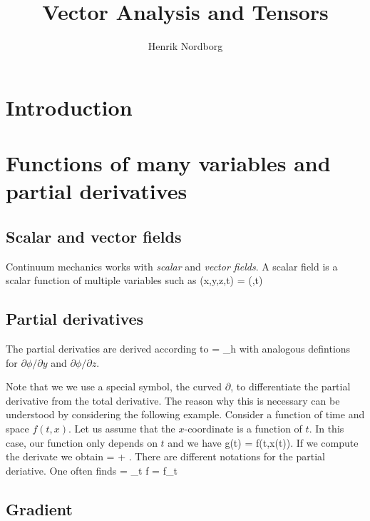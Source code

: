 \documentclass[a4paper,11pt]{article}
\begin{document}

\title{Vector Analysis and Tensors}
\author{Henrik Nordborg}
\maketitle

\section{Introduction}

\section{Functions of many variables and partial derivatives}


\subsection{Scalar and vector fields}

Continuum mechanics works with \emph{scalar} and \emph{vector fields}. A scalar field is a scalar function of multiple variables such as 
\be
\phi(x,y,z,t) = \phi(\xvec,t)
\ee

\subsection{Partial derivatives}

The partial derivaties are derived according to
\be
{} = \lim_{h} 
\ee
with analogous defintions for ${\partial \phi}/{\partial y}$ and ${\partial \phi}/{\partial z}$.

Note that we we use a special symbol, the curved $\partial$, to differentiate the partial derivative from the total derivative. The reason why this is necessary can be understood by considering the following example. Consider a function of time and space $f(t,x)$. Let us assume that the  $x$-coordinate is a function of $t$. In this case, our function only depends on $t$ and we have
\be
g(t) = f(t,x(t)).
\ee
If we compute the derivate we obtain
\be
{} =  +  .
\ee
There are different notations for the partial deriative. One often finds
\be
{}  = \partial_t f = f_t
\ee

\subsection{Gradient}
\end{document}
